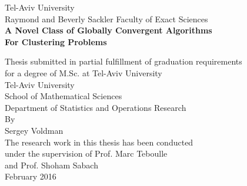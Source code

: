 
 \thispagestyle{empty}

\vspace{3cm}
\begin{center}
Tel-Aviv University\\
Raymond and Beverly Sackler Faculty of Exact Sciences\\
\vspace{2.5cm} {\bf A Novel Class of Globally Convergent Algorithms\\ For Clustering Problems}\\
 \vspace{2.5cm}

Thesis submitted in partial fulfillment of graduation requirements\\
for a degree of M.Sc. at Tel-Aviv University\\
\vspace{2cm}
Tel-Aviv University\\
School of Mathematical Sciences\\
Department of Statistics and Operations Research\\
\vspace{2cm}
By\\
Sergey Voldman\\
\vspace{2cm}
The research work in this thesis has been conducted\\
under the supervision of Prof. Marc Teboulle\\
and Prof. Shoham Sabach\\
\vspace{2cm}
February 2016\\
\end{center}

\nobreak
